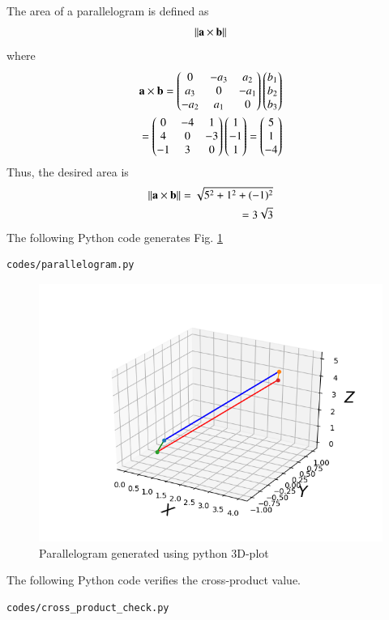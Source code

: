 The area of a parallelogram is defined as
\begin{align}
\left\lVert\mathbf{a} \times \mathbf{b}\right\rVert
\end{align}
where
\begin{align}
\mathbf{a} \times \mathbf{b} = 
\begin{pmatrix}
      0       & -a_3    & a_2 \\ 
      a_3       & 0    & -a_1 \\
      -a_2       & a_1     & 0 
\end{pmatrix}      
\begin{pmatrix}
      b_1 \\ 
      b_2 \\
      b_3 
\end{pmatrix}
\\
=\begin{pmatrix}
      0       & -4    & 1 \\ 
      4       & 0    & -3 \\
      -1       & 3     & 0 
\end{pmatrix}
\begin{pmatrix}      
      1\\ 
      -1\\
      1
\end{pmatrix}      
=\begin{pmatrix}
      5\\ 
      1\\
      -4
\end{pmatrix}      
\end{align}
Thus, the desired area is 
\begin{align}
\left\lVert\mathbf{a} \times \mathbf{b}\right\rVert = \sqrt{5^2 + 1^2 + (-1)^2}
\\
=3\sqrt{3}
\end{align}
The  following Python code generates Fig. \ref{fig:solutions_quad_8paral_sss_py}
%
\begin{lstlisting}
codes/parallelogram.py
\end{lstlisting}
\begin{figure}[!ht]
\centering
\includegraphics[width=\columnwidth]{./solutions/quad/8/figs/parallelogram.png}
\caption{Parallelogram generated using python 3D-plot}
\label{fig:solutions_quad_8paral_sss_py}
\end{figure}

The  following Python code verifies the cross-product value.

\begin{lstlisting}
codes/cross_product_check.py
\end{lstlisting}
